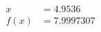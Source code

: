 \documentclass[preview]{standalone}
\begin{document}
\begin{align*}
x &= 4.9536\\f(x) &= 7.9997307
\end{align*}
\end{document}
